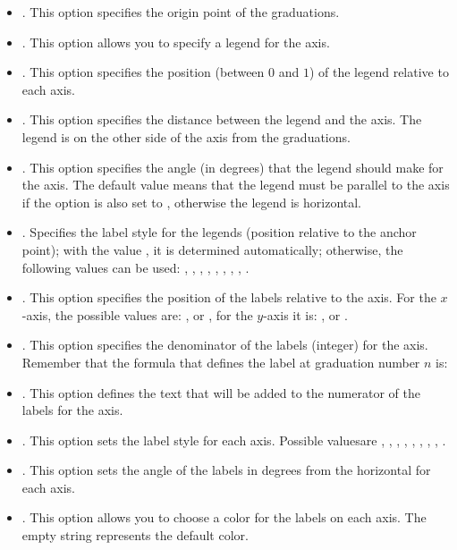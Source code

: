 \begin{itemize}
\begin{itemize}
    The formula that defines the label at tick mark number $n$ is: 

        \item {}. This option specifies the origin point of the graduations.
        
        \item {}. This option allows you to specify a legend for the axis.
        \item {}. This option specifies the position (between $0$ and $1$) of the legend relative to each axis.
        \item {}. This option specifies the distance between the legend and the axis. The legend is on the other side of the axis from the graduations.
        \item {}. This option specifies the angle (in degrees) that the legend should make for the axis. The default value  means that the legend must be parallel to the axis if the  option is also set to , otherwise the legend is horizontal.
        
        \item {}. Specifies the label style for the legends (position relative to the anchor point); with the value , it is determined automatically; otherwise, the following values ​​can be used:  , , , , , , , , .
        
        \item {}. This option specifies the position of the labels relative to the axis. For the $x$-axis, the possible values ​​are: ,  or , for the $y$-axis it is:  ,  or .

        \item {}. ​​This option specifies the denominator of the labels (integer) for the axis. Remember that the formula that defines the label at graduation number $n$ is: 
        \item {}. This option defines the text that will be added to the numerator of the labels for the axis.
        \item {}. This option sets the label style for each axis. Possible values ​​are , , , , , , , , .
        \item {}. This option sets the angle of the labels in degrees from the horizontal for each axis.
        \item {}. This option allows you to choose a color for the labels on each axis. The empty string represents the default color.
        

\end{itemize}
\end{itemize}
